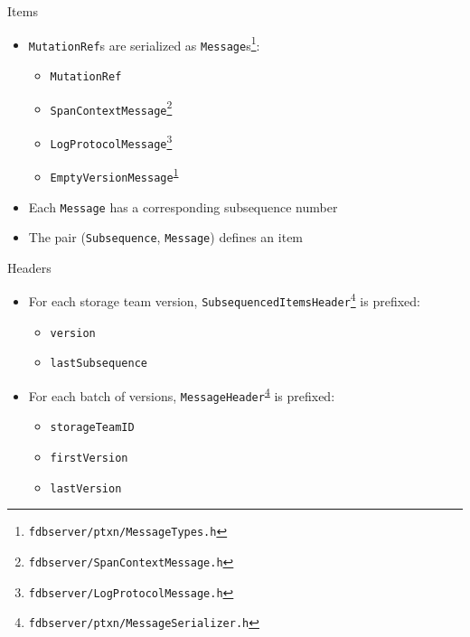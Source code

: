 \documentclass[9pt]{beamer}
\begin{document}
    \begin{frame}{Items}
        \begin{itemize}
            \item \texttt{MutationRef}s are serialized as \texttt{Message}s\footnote{\label{messageTypes}\texttt{fdbserver/ptxn/MessageTypes.h}}:
            \begin{itemize}
                \item \texttt{MutationRef}
                \vspace{5pt}
                \item \texttt{SpanContextMessage}\footnote{\texttt{fdbserver/SpanContextMessage.h}}
                \item {\color{gray}\texttt{LogProtocolMessage}}\footnote{\texttt{fdbserver/LogProtocolMessage.h}}
                \vspace{5pt}
                \item {\color{lightgray}\texttt{EmptyVersionMessage}}\textsuperscript{\ref{messageTypes}}
            \end{itemize}

            \item Each \texttt{Message} has a corresponding subsequence number

            \item The pair (\texttt{Subsequence}, \texttt{Message}) defines an item 
        \end{itemize}
    \end{frame}

    \begin{frame}{Headers}
        \begin{itemize}
            \item For each storage team version, \texttt{SubsequencedItemsHeader}\footnote{\label{messageSerializer}\texttt{fdbserver/ptxn/MessageSerializer.h}} is prefixed:
            \begin{itemize}
                \item \texttt{version}
                \item \texttt{lastSubsequence}
            \end{itemize}
            \item For each batch of versions, \texttt{MessageHeader}\textsuperscript{\ref{messageSerializer}} is prefixed:
            \begin{itemize}
                \item \texttt{storageTeamID}
                \item \texttt{firstVersion}
                \item \texttt{lastVersion}
            \end{itemize}
        \end{itemize}
    \end{frame}
\end{document}
